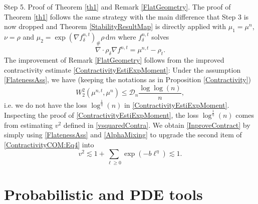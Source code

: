 \documentclass[11pt,a4paper,oneside]{amsart}
\numberwithin{equation}{section}
\newcommand{\dd}{\mathrm{d}}
\begin{document}
%
\medskip
%

{\sc Step 5. Proof of Theorem \ref{th1} and Remark \ref{FlatGeometry}. }The proof of Theorem \ref{th1} follows the same strategy with the main difference that Step 3 is now dropped and Theorem \ref{StabilityResultMap} is directly applied with $\mu_1=\mu^n$, $\nu=\rho$ and $\mu_2=\exp(\nabla f^{n,t}_\delta)_\#\rho\,\dd m$ where $f^{n,t}_\delta$ solves 
%
$$\nabla\cdot \rho_\delta\nabla f^{n,t}=\mu^{n,t}-\rho_t.$$
%
The improvement of Remark \ref{FlatGeometry} follows from the improved contractivity estimate \eqref{ContractivityEstiExpMoment}: Under the assumption \ref{FlatenessAss}, we have (keeping the notations as in Proposition \ref{Contractivity})
%
\begin{equation}\label{InproveContract}
%
W^2_2(\mu^{n,t},\mu^n)\leq \mathcal{D}_n\frac{\log\log(n)}{n},
%
\end{equation}
%
i.e. we do not have the loss $\log^\frac{1}{\eta}(n)$ in \eqref{ContractivityEstiExpMoment}. Inspecting the proof of \eqref{ContractivityEstiExpMoment}, the loss $\log^{\frac{1}{\eta}}(n)$ comes from estimating $v^2$ defined in \eqref{vsquaredContra}. We obtain \eqref{InproveContract} by simply using \eqref{FlatenessAss} and \eqref{AlphaMixing} to upgrade the second item of \eqref{ContractivityCOM:Eq4} into
%
$$v^2\lesssim 1+\sum_{\ell\geq 0}\exp(-b\ell^\eta)\lesssim 1.$$
%
%
\appendix
%
\section{Probabilistic and PDE tools}\label{app:ProbPDE}
%
\end{document}
